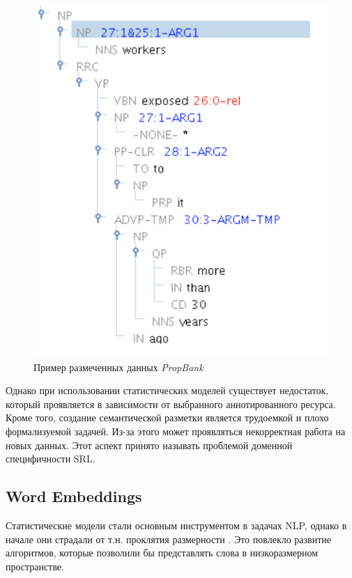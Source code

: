 \begin{figure}[t]
\centering
\includegraphics[scale=0.45]{img/redrelex.png}
\caption{\label{fig:redrelex}Пример размеченных данных \emph{PropBank}}
\end{figure}

Однако при использовании статистических моделей существует недостаток, который проявляется в зависимости от выбранного аннотированного ресурса. Кроме того, создание семантической разметки является трудоемкой и плохо формализуемой задачей. Из-за этого может проявляться некорректная работа на новых данных. Этот аспект принято называть проблемой доменной специфичности SRL.

\subsection{Word Embeddings}

Статистические модели стали основным инструментом в задачах NLP, однако в начале они страдали от т.н. проклятия размерности \autocite{bellman1957dynamic}. Это повлекло развитие алгоритмов, которые позволили бы представлять слова в низкоразмерном пространстве.

